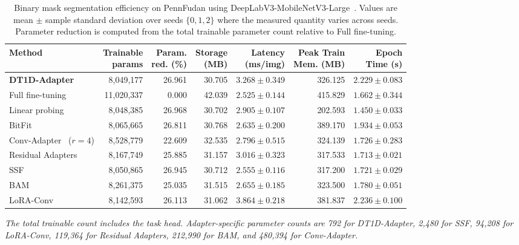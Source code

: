 \documentclass[pdflatex,sn-mathphys-num]{sn-jnl}
\theoremstyle{thmstyleone}
\theoremstyle{thmstyletwo}
\theoremstyle{thmstylethree}
\begin{document}
\begin{table}[!htbp]
\centering
\caption{Binary mask segmentation efficiency on PennFudan using DeepLabV3-MobileNetV3-Large~\cite{chen2018deeplab,howard2019mobilenetv3}. Values are mean $\pm$ sample standard deviation over seeds $\{0,1,2\}$ where the measured quantity varies across seeds. Parameter reduction is computed from the total trainable parameter count relative to Full fine-tuning.}
\label{tab:seg_eff_deeplab_pennfudan}
\scriptsize
\setlength{\tabcolsep}{2.4pt}
\renewcommand{\arraystretch}{1.12}
\begin{tabularx}{\textwidth}{@{}Xrrrrrr@{}}
\toprule
\textbf{Method} &
\makecell{\textbf{Trainable}\\\textbf{params}} &
\makecell{\textbf{Param.}\\\textbf{red. (\%)}} &
\makecell{\textbf{Storage}\\\textbf{(MB)}} &
\makecell{\textbf{Latency}\\\textbf{(ms/img)}} &
\makecell{\textbf{Peak Train}\\\textbf{Mem. (MB)}} &
\makecell{\textbf{Epoch}\\\textbf{Time (s)}} \\
\midrule
\textbf{DT1D-Adapter} & 8,049,177 & 26.961 & 30.705 & $3.268\pm0.349$ & 326.125 & $2.229\pm0.083$ \\
Full fine-tuning & 11,020,337 & 0.000 & 42.039 & $2.525\pm0.144$ & 415.829 & $1.662\pm0.344$ \\
Linear probing & 8,048,385 & 26.968 & 30.702 & $2.905\pm0.107$ & 202.593 & $1.450\pm0.033$ \\
BitFit~\cite{zaken2022bitfit} & 8,065,665 & 26.811 & 30.768 & $2.635\pm0.200$ & 389.170 & $1.934\pm0.053$ \\
Conv-Adapter~\cite{chen2024convadapter} ($r=4$) & 8,528,779 & 22.609 & 32.535 & $2.796\pm0.515$ & 324.139 & $1.726\pm0.283$ \\
Residual Adapters~\cite{rebuffi2017residual} & 8,167,749 & 25.885 & 31.157 & $3.016\pm0.323$ & 317.533 & $1.713\pm0.021$ \\
SSF~\cite{lian2022ssf} & 8,050,865 & 26.945 & 30.712 & $2.555\pm0.116$ & 317.200 & $1.721\pm0.029$ \\
BAM~\cite{park2020lightweightattention} & 8,261,375 & 25.035 & 31.515 & $2.655\pm0.185$ & 323.500 & $1.780\pm0.051$ \\
LoRA-Conv~\cite{hu2022lora,chollet2017xception} & 8,142,593 & 26.113 & 31.062 & $3.864\pm0.218$ & 381.837 & $2.236\pm0.100$ \\
\bottomrule
\end{tabularx}

\vspace{2pt}
{\footnotesize\textit{The total trainable count includes the task head. Adapter-specific parameter counts are 792 for DT1D-Adapter, 2,480 for SSF, 94,208 for LoRA-Conv, 119,364 for Residual Adapters, 212,990 for BAM, and 480,394 for Conv-Adapter.}}
\end{table}
\end{document}
